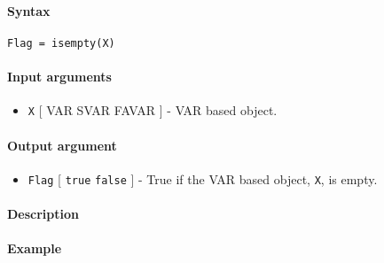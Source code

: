


	\paragraph{Syntax}

\begin{verbatim}
Flag = isempty(X)
\end{verbatim}

\paragraph{Input arguments}

\begin{itemize}
\itemsep1pt\parskip0pt
\item
  \texttt{X} {[} VAR \textbar{} SVAR \textbar{} FAVAR {]} - VAR based
  object.
\end{itemize}

\paragraph{Output argument}

\begin{itemize}
\itemsep1pt\parskip0pt
\item
  \texttt{Flag} {[} \texttt{true} \textbar{} \texttt{false} {]} - True
  if the VAR based object, \texttt{X}, is empty.
\end{itemize}

\paragraph{Description}

\paragraph{Example}


